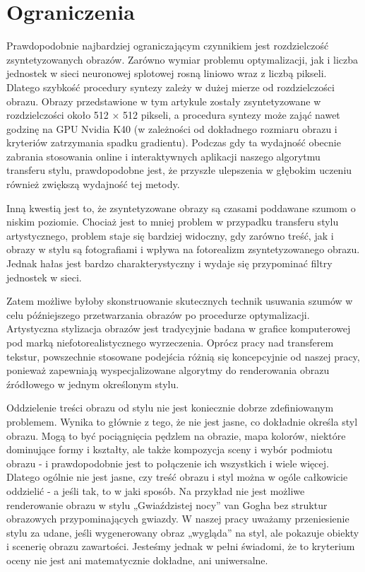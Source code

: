 \documentclass[brudnopis]{xmgr}
\begin{document}
						
\section{Ograniczenia\label{s:dsssl}}

Prawdopodobnie najbardziej ograniczającym czynnikiem jest rozdzielczość zsyntetyzowanych obrazów. Zarówno wymiar problemu optymalizacji, jak i liczba jednostek w sieci neuronowej splotowej rosną liniowo wraz z liczbą pikseli. Dlatego szybkość procedury syntezy zależy w dużej mierze od rozdzielczości obrazu. Obrazy przedstawione w tym artykule zostały zsyntetyzowane w rozdzielczości około 512 × 512 pikseli, a procedura syntezy może zająć nawet godzinę na GPU Nvidia K40 (w zależności od dokładnego rozmiaru obrazu i kryteriów zatrzymania spadku gradientu). Podczas gdy ta wydajność obecnie zabrania stosowania online i interaktywnych aplikacji naszego algorytmu transferu stylu, prawdopodobne jest, że przyszłe ulepszenia w głębokim uczeniu również zwiększą wydajność tej metody.

Inną kwestią jest to, że zsyntetyzowane obrazy są czasami poddawane szumom o niskim poziomie. Chociaż jest to mniej problem w przypadku transferu stylu artystycznego, problem staje się bardziej widoczny, gdy zarówno treść, jak i obrazy w stylu są fotografiami i wpływa na fotorealizm zsyntetyzowanego obrazu. Jednak hałas jest bardzo charakterystyczny i wydaje się przypominać filtry jednostek w sieci. 

Zatem możliwe byłoby skonstruowanie skutecznych technik usuwania szumów w celu późniejszego przetwarzania obrazów po procedurze optymalizacji.
Artystyczna stylizacja obrazów jest tradycyjnie badana w grafice komputerowej pod marką niefotorealistycznego wyrzeczenia. Oprócz pracy nad transferem tekstur, powszechnie stosowane podejścia różnią się koncepcyjnie od naszej pracy, ponieważ zapewniają wyspecjalizowane algorytmy do renderowania obrazu źródłowego w jednym określonym stylu. 

Oddzielenie treści obrazu od stylu nie jest koniecznie dobrze zdefiniowanym problemem. Wynika to głównie z tego, że nie jest jasne, co dokładnie określa styl obrazu. Mogą to być pociągnięcia pędzlem na obrazie, mapa kolorów, niektóre dominujące formy i kształty, ale także kompozycja sceny i wybór podmiotu obrazu - i prawdopodobnie jest to połączenie ich wszystkich i wiele więcej. Dlatego ogólnie nie jest jasne, czy treść obrazu i styl można w ogóle całkowicie oddzielić - a jeśli tak, to w jaki sposób. Na przykład nie jest możliwe renderowanie obrazu w stylu „Gwiaździstej nocy” van Gogha bez struktur obrazowych przypominających gwiazdy. W naszej pracy uważamy przeniesienie stylu za udane, jeśli wygenerowany obraz „wygląda” na styl, ale pokazuje obiekty i scenerię obrazu zawartości. Jesteśmy jednak w pełni świadomi, że to kryterium oceny nie jest ani matematycznie dokładne, ani uniwersalne.
\end{document}
